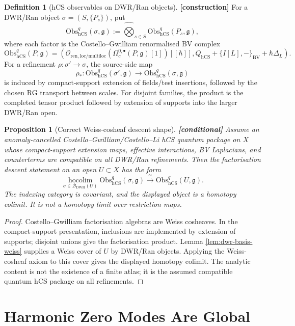 \documentclass[11pt]{article}
\newtheorem{proposition}[theorem]{Proposition}
\theoremstyle{definition}
\newtheorem{definition}[theorem]{Definition}
\providecommand{\ClaimStatusConstruction}{\textbf{[construction]}}
\providecommand{\ClaimStatusConditional}{\textbf{[conditional]}}
\providecommand{\Obs}{\mathrm{Obs}}
\providecommand{\hCS}{\mathrm{hCS}}
\providecommand{\frakg}{\mathfrak{g}}
\providecommand{\hocolim}{\operatorname*{hocolim}}
\providecommand{\cB}{\mathcal{B}}
\begin{document}
\begin{definition}[hCS observables on DWR/Ran objects]
\label{def:hcs-observables-dwr}
\ClaimStatusConstruction{}
For a DWR/Ran object $\sigma=(S,\{P_s\})$, put
\[
 \Obs_{\hCS}^{q}(\sigma,\frakg)
 :=
 \widehat{\bigotimes}_{s\in S}
 \Obs_{\hCS}^{q}(P_s,\frakg),
\]
where each factor is the Costello--Gwilliam renormalised BV complex
\[
 \Obs_{\hCS}^{q}(P,\frakg)
 =
 \left(
 \mathcal O_{\mathrm{ren,loc/multiloc}}
 (\Omega_c^{0,\bullet}(P,\frakg)[1])[[\hbar]],
 Q_{\hCS}+\{I[L],-\}_{\mathrm{BV}}+\hbar\Delta_L
 \right).
\]
For a refinement $\rho:\sigma'\to\sigma$, the source-side map
\[
 \rho_*:\Obs_{\hCS}^{q}(\sigma',\frakg)
 \longrightarrow
 \Obs_{\hCS}^{q}(\sigma,\frakg)
\]
is induced by compact-support extension of fields/test insertions,
followed by the chosen RG transport between scales. For disjoint
families, the product is the completed tensor product followed by
extension of supports into the larger DWR/Ran open.
\end{definition}

\begin{proposition}[Correct Weiss-cosheaf descent shape]
\label{prop:correct-weiss-cosheaf-shape}
\ClaimStatusConditional{}
Assume an anomaly-cancelled Costello--Gwilliam/Costello--Li hCS quantum
package on $X$ whose compact-support extension maps, effective
interactions, BV Laplacians, and counterterms are compatible on all
DWR/Ran refinements. Then the factorisation descent statement on an
open $U\subset X$ has the form
\[
 \hocolim_{\sigma\in\cB_{\mathrm{DWR}}(U)}
 \Obs_{\hCS}^{q}(\sigma,\frakg)
 \xrightarrow{\;\simeq\;}
 \Obs_{\hCS}^{q}(U,\frakg).
\]
The indexing category is covariant, and the displayed object is a
homotopy colimit. It is not a homotopy limit over restriction maps.
\end{proposition}

\begin{proof}
Costello--Gwilliam factorisation algebras are Weiss cosheaves. In the
compact-support presentation, inclusions are implemented by extension
of supports; disjoint unions give the factorisation product. Lemma
\ref{lem:dwr-basis-weiss} supplies a Weiss cover of $U$ by DWR/Ran
objects. Applying the Weiss-cosheaf axiom to this cover gives the
displayed homotopy colimit. The analytic content is not the existence
of a finite atlas; it is the assumed compatible quantum hCS package on
all refinements.
\end{proof}

\section{Harmonic Zero Modes Are Global}
\label{sec:harmonic-global}
\end{document}
